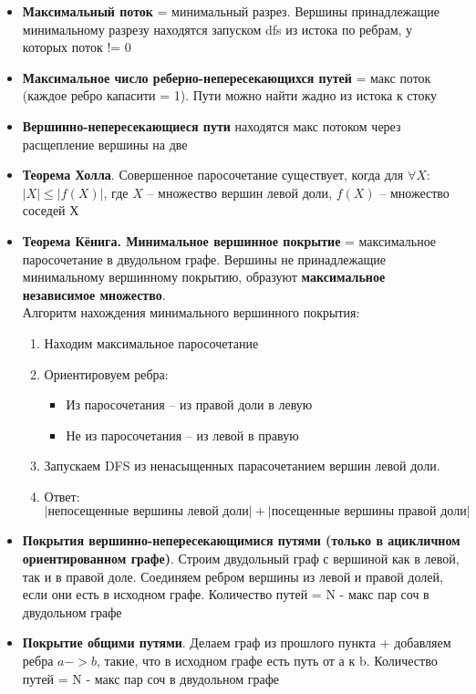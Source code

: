 \documentclass[10pt]{article}
\begin{document}
\begin{itemize}
\begin{itemize}
\end{itemize}
\item \textbf{Максимальный поток} = минимальный разрез. Вершины принадлежащие минимальному разрезу находятся запуском dfs из истока по ребрам, у которых поток != 0
\item \textbf{Максимальное число реберно-непересекающихся путей} = макс поток (каждое ребро капасити = 1). Пути можно найти жадно из истока к стоку
\item \textbf{Вершинно-непересекающиеся пути} находятся макс потоком через расщепление вершины на две
\item \textbf{Теорема Холла}. Совершенное паросочетание существует, когда для $\forall X$:
$\left|X\right| \le \left|f(X) \right|$, где $X$ -- множество вершин левой доли, $f(X)$ -- множество соседей Х
\item \textbf{Теорема Кёнига. Минимальное вершинное покрытие} = максимальное паросочетание в двудольном графе. 
Вершины не принадлежащие минимальному вершинному покрытию, образуют 
\textbf{максимальное независимое множество}.\\
Алгоритм нахождения минимального вершинного покрытия:
\begin{enumerate}
  \item Находим максимальное паросочетание
  \item Ориентировуем ребра:
  \begin{itemize}
    \item Из паросочетания -- из правой доли в левую
    \item Не из паросочетания -- из левой в правую
  \end{itemize}
  \item Запускаем DFS из ненасыщенных парасочетанием вершин левой доли.
  \item Ответ: $\left|\text{непосещенные вершины левой доли}\right| + \left|\text{посещенные вершины правой доли}\right|$
\end{enumerate}
\item \textbf{Покрытия вершинно-непересекающимися путями (только в ацикличном ориентированном графе)}.
Строим двудольный граф с вершиной как в левой, так и в правой доле.
Соединяем ребром вершины из левой и правой долей, если они есть в исходном графе.
Количество путей = N - макс пар соч в двудольном графе
\item \textbf{Покрытие общими путями}.
Делаем граф из прошлого пункта + добавляем ребра $a->b$, такие, что
в исходном графе есть путь от а к b. Количество путей = N - макс пар соч в двудольном графе
\end{itemize}
\end{document}
